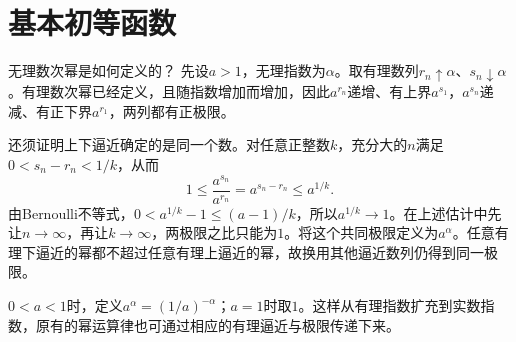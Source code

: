 \par\addvspace{12pt}

\section{基本初等函数}

\label{sol:sec:functions:3}

无理数次幂是如何定义的？
\solutionanswer
先设\(a>1\)，无理指数为\(\alpha\)。取有理数列\(r_n\uparrow\alpha\)、\(s_n\downarrow\alpha\)。有理数次幂已经定义，且随指数增加而增加，因此\(a^{r_n}\)递增、有上界\(a^{s_1}\)，\(a^{s_n}\)递减、有正下界\(a^{r_1}\)，两列都有正极限。

还须证明上下逼近确定的是同一个数。对任意正整数\(k\)，充分大的\(n\)满足\(0<s_n-r_n<1/k\)，从而
\[
1\le\frac{a^{s_n}}{a^{r_n}}=a^{s_n-r_n}\le a^{1/k}.
\]
由Bernoulli不等式，\(0<a^{1/k}-1\le(a-1)/k\)，所以\(a^{1/k}\to1\)。在上述估计中先让\(n\to\infty\)，再让\(k\to\infty\)，两极限之比只能为\(1\)。将这个共同极限定义为\(a^\alpha\)。任意有理下逼近的幂都不超过任意有理上逼近的幂，故换用其他逼近数列仍得到同一极限。

\(0<a<1\)时，定义\(a^\alpha=(1/a)^{-\alpha}\)；\(a=1\)时取\(1\)。这样从有理指数扩充到实数指数，原有的幂运算律也可通过相应的有理逼近与极限传递下来。
\par
